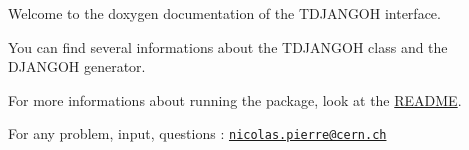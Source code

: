 Welcome to the doxygen documentation of the T\+D\+J\+A\+N\+G\+OH interface.

You can find several informations about the T\+D\+J\+A\+N\+G\+OH class and the D\+J\+A\+N\+G\+OH generator.

For more informations about running the package, look at the \hyperlink{md__r_e_a_d_m_e}{R\+E\+A\+D\+ME}.

For any problem, input, questions \+: \href{mailto:nicolas.pierre@cern.ch}{\tt nicolas.\+pierre@cern.\+ch} 